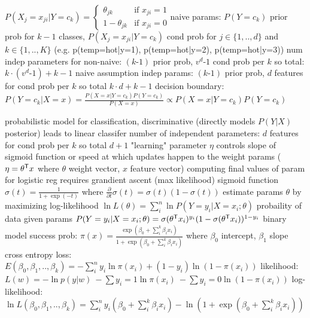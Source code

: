 \documentclass[10pt]{article}
\begin{document}
 $P(X_j=x_{ji}|Y=c_k) = \begin{cases} \theta_{jk} & \text{if } x_{ji} = 1 \\ 1-\theta_{jk} & \text{if } x_{ji} = 0 \end{cases}$\NEW naive params: $P(Y=c_k)$ prior prob for $k-1$ classes, $P(X_j=x_{ji}|Y=c_k)$ cond prob for $j\in\{1,..,d\}$ and $k\in\{1,..,K\}$ (e.g. p(temp=hot|y=1), p(temp=hot|y=2), p(temp=hot|y=3))
\NEW num indep parameters for non-naive: $(k\text{-}1)$ prior prob, $v^d\text{-}1$ cond prob per $k$ so total: $k\cdot(v^d\text{-}1) + k - 1$
\NEW naive assumption indep params:  $(k\text{-}1)$ prior prob, $d$ features for cond prob per $k$ so total $k\cdot d + k - 1$
\NEW decision boundary: $P(Y=c_k|X=x) = \frac{P(X=x|Y=c_k)P(Y=c_k)}{P(X=x)} \propto P(X=x|Y=c_k)P(Y=c_k)$

\NEW probabilistic model for classification, discriminative (directly models $P(Y|X)$ posterior)
\NEW leads to linear classifer
\NEW number of independent parameters: $d$ features for cond prob per $k$ so total $d+1$
\NEW "learning" parameter $\eta$ controls slope of sigmoid function or speed at which updates happen to the weight params ($\eta= \theta^{\mathsf{T}} x$ where $\theta$ weight vector, $x$ feature vector)
\NEW computing final values of param for logistic reg requires grandient ascent (max likelihood)
\NEW sigmoid function $\sigma(t) = \frac{1}{1+\exp(-t)}$ where $\frac{\partial}{\partial t}\sigma(t) = \sigma(t)(1-\sigma(t))$
\NEW estimate params $\theta$ by maximizing log-likelihood $\ln L(\theta) = \sum_i^n \ln P(Y=y_i|X=x_i;\theta)$
\NEW probaility of data given params $P(Y=y_i|X=x_i;\theta) = \sigma(\theta^{\mathsf{T}} x_i)^{y_i} (1-\sigma(\theta^{\mathsf{T}} x_i))^{1-y_i}$
\NEW binary model success prob: $\pi(x) = \frac{\exp(\beta_0 +\sum_i^k \beta_i x_i)}{1+\exp(\beta_0 +\sum_i^k \beta_i x_i)}$ where $\beta_0$ intercept, $\beta_1$ slope
\NEW cross entropy loss: $E(\beta_0, \beta_1,..,\beta_k) = -\sum_i^n y_i \ln \pi(x_i) + (1-y_i) \ln (1-\pi(x_i))$
\NEW likelihood: $L(w) = -\ln p(y|w) \ -\sum{y_i=1} \ln \pi(x_i) \ -\sum{y_i=0} \ln (1-\pi(x_i))$
\NEW log-likelihood: $\ln L(\beta_0, \beta_1,..,\beta_k) = \sum_i^n y_i(\beta_0 +\sum_i^k \beta_i x_i) - \ln(1+\exp(\beta_0 +\sum_i^k \beta_i x_i))$
\end{document}
